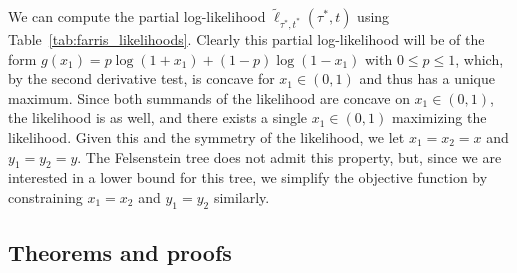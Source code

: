 We can compute the partial log-likelihood $\tilde{\ell}_{\tau^*,t^*}(\tau^*, t)$ using Table~\ref{tab:farris_likelihoods}.
Clearly this partial log-likelihood will be of the form $g(x_1) = p\log(1+x_1) + (1-p)\log(1-x_1)$ with $0 \le p \le 1$, which, by the second derivative test, is concave for $x_1\in(0,1)$ and thus has a unique maximum.
Since both summands of the likelihood are concave on $x_1\in(0,1)$, the likelihood is as well, and there exists a single $x_1\in(0,1)$ maximizing the likelihood.
Given this and the symmetry of the likelihood, we let $x_1=x_2=x$ and $y_1=y_2=y$.
The Felsenstein tree does not admit this property, but, since we are interested in a lower bound for this tree, we simplify the objective function by constraining $x_1=x_2$ and $y_1=y_2$ similarly.

\subsection*{Theorems and proofs}

\topoInconsist*

